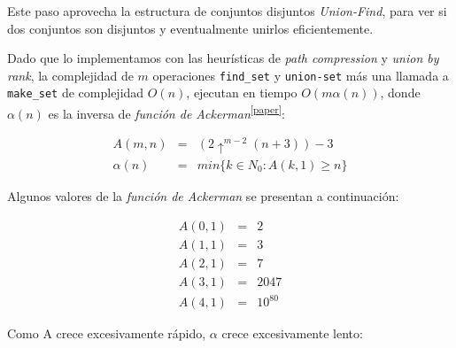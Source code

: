 
Este paso aprovecha la estructura de conjuntos disjuntos \textit{Union-Find}, para ver si dos conjuntos son disjuntos y eventualmente unirlos eficientemente. 

Dado que lo implementamos con las heur\'isticas de \textit{path compression} y \textit{union by rank}, la complejidad de $m$ operaciones \texttt{find_set} y \texttt{union-set} m\'as una llamada a \texttt{make_set} de complejidad $O(n)$, ejecutan en tiempo $O(m\alpha(n))$, donde $\alpha(n)$ es la inversa de\emph{ funci\'on de Ackerman}\textsuperscript{\ref{paper}}:

\begin{equation*}
\begin{array}{lll}
A(m,n) & = & (2\uparrow^{m-2}(n+3))-3 \\
\alpha(n) & = & min\{k \in N_0 : A(k,1) \geq n\}
\end{array}
\end{equation*}

	Algunos valores de la \emph{funci\'on de Ackerman} se presentan a continuaci\'on:

\begin{equation*}
\begin{array}{lll}
A(0,1) & = & 2 \\
A(1,1) & = & 3 \\
A(2,1) & = & 7 \\
A(3,1) & = & 2047 \\
A(4,1) & = & 10^{80}
\end{array}
\end{equation*}

	Como A crece excesivamente r\'apido, $\alpha$ crece excesivamente lento:

